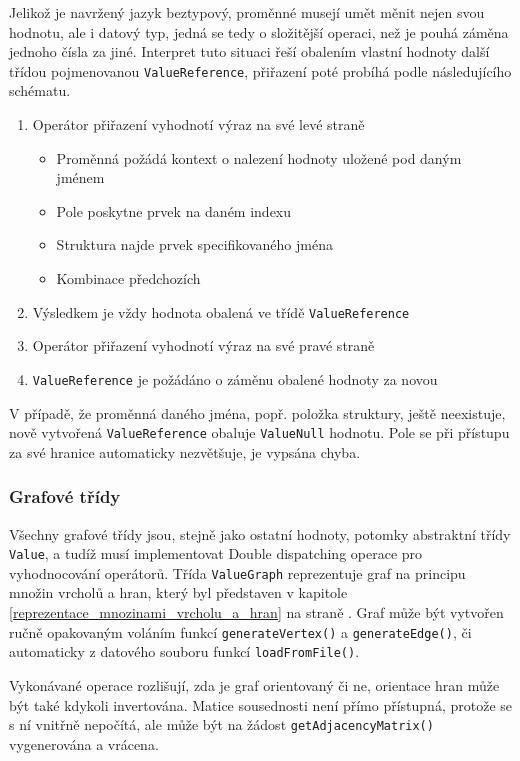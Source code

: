\documentclass[11pt,twoside,a4paper]{book}
\begin{document}
Jelikož je navržený jazyk beztypový, proměnné musejí umět měnit nejen svou hodnotu, ale i datový typ, jedná se tedy o složitější operaci, než je pouhá záměna jednoho čísla za jiné. Interpret tuto situaci řeší obalením vlastní hodnoty další třídou pojmenovanou \texttt{ValueReference}, přiřazení poté probíhá podle následujícího schématu.

\begin{enumerate}
\item Operátor přiřazení vyhodnotí výraz na své levé straně
	\begin{itemize}
	\item Proměnná požádá kontext o nalezení hodnoty uložené pod daným jménem
	\item Pole poskytne prvek na daném indexu
	\item Struktura najde prvek specifikovaného jména
	\item Kombinace předchozích
	\end{itemize}
\item Výsledkem je vždy hodnota obalená ve třídě \texttt{ValueReference}
\item Operátor přiřazení vyhodnotí výraz na své pravé straně
\item \texttt{ValueReference} je požádáno o záměnu obalené hodnoty za novou
\end{enumerate}

V případě, že proměnná daného jména, popř. položka struktury, ještě neexistuje, nově vytvořená \texttt{ValueReference} obaluje \texttt{ValueNull} hodnotu. Pole se při přístupu za své hranice automaticky nezvětšuje, je vypsána chyba.


\subsubsection{Grafové třídy}

Všechny grafové třídy jsou, stejně jako ostatní hodnoty, potomky abstraktní třídy \texttt{Value}, a tudíž musí implementovat Double dispatching operace pro vyhodnocování operátorů. Třída \texttt{ValueGraph} reprezentuje graf na principu množin vrcholů a hran, který byl představen v kapitole \ref{reprezentace_mnozinami_vrcholu_a_hran} na straně \pageref{reprezentace_mnozinami_vrcholu_a_hran}. Graf může být vytvořen ručně opakovaným voláním funkcí \texttt{generateVertex()} a \texttt{generateEdge()}, či automaticky z datového souboru funkcí \texttt{lo\-ad\-From\-Fi\-le()}.

Vykonávané operace rozlišují, zda je graf orientovaný či ne, orientace hran může být také kdykoli invertována. Matice sousednosti není přímo přístupná, protože se s ní vnitřně nepočítá, ale může být na žádost \texttt{getAdjacencyMatrix()} vygenerována a vrácena.
\end{document}
